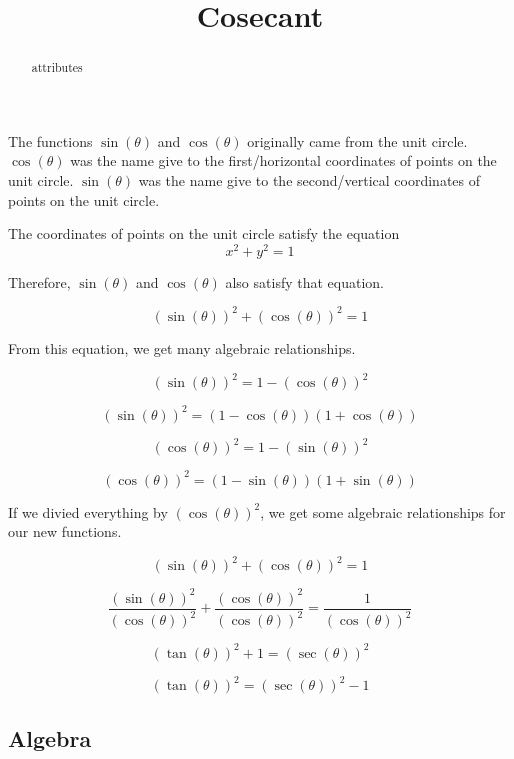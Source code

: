 \documentclass{ximera}
\title{Cosecant}
\begin{document}
\begin{abstract}
attributes
\end{abstract}
\maketitle







The functions $\sin(\theta)$ and $\cos(\theta)$ originally came from the unit circle.  $\cos(\theta)$ was the name give to the first/horizontal coordinates of points on the unit circle.   $\sin(\theta)$ was the name give to the second/vertical coordinates of points on the unit circle. 


The coordinates of points on the unit circle satisfy the equation
\[
x^2 + y^2 = 1
\]


Therefore, $\sin(\theta)$ and $\cos(\theta)$ also satisfy that equation.


\[
(\sin(\theta))^2 + (\cos(\theta))^2 = 1
\]


From this equation, we get many algebraic relationships.



\[
(\sin(\theta))^2  = 1 - (\cos(\theta))^2
\]


\[
(\sin(\theta))^2  = (1 - \cos(\theta))  (1 + \cos(\theta))
\]




\[
(\cos(\theta))^2  = 1 - (\sin(\theta))^2
\]


\[
(\cos(\theta))^2  = (1 - \sin(\theta))  (1 + \sin(\theta))
\]



If we divied everything by $(\cos(\theta))^2$, we get some algebraic relationships for our new functions.


\[
(\sin(\theta))^2 + (\cos(\theta))^2 = 1
\]


\[
\frac{(\sin(\theta))^2}{(\cos(\theta))^2} + \frac{(\cos(\theta))^2}{(\cos(\theta))^2} = \frac{1}{(\cos(\theta))^2}
\]


\[
(\tan(\theta))^2 + 1 = (\sec(\theta))^2
\]


\[
(\tan(\theta))^2  = (\sec(\theta))^2 - 1
\]





\subsection*{Algebra}
\end{document}
